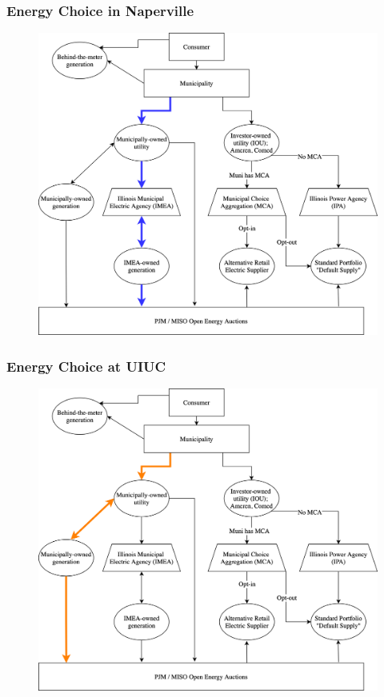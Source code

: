 \begin{frame}
    \frametitle{Energy Choice in Naperville}
    \begin{figure}
        \centering
        \includegraphics[height=0.8\textheight]{images/naperville-electric-choice.png}
    \end{figure}
\end{frame}

\begin{frame}
    \frametitle{Energy Choice at UIUC}
    \begin{figure}
        \centering
        \includegraphics[height=0.8\textheight]{images/uiuc-electric-choice.png}
    \end{figure}
\end{frame}

